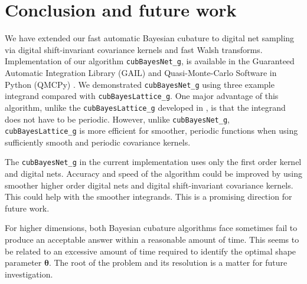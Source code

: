 \documentclass[graybox,footinfo]{svmult}
\newcommand{\FJHNote}[1]{{\textcolor{blue}{FJH: #1}}}
\begin{document}







\section{Conclusion and future work}
\label{FJ:sec:conclusion-future-work}

We have extended our fast automatic Bayesian cubature to digital net sampling via digital shift-invariant covariance kernels and fast Walsh transforms.  Implementation of our algorithm \texttt{cubBayesNet\_g}, is available in the Guaranteed Automatic Integration Library (GAIL) \cite{ChoEtal21a} and Quasi-Monte-Carlo Software in Python (QMCPy) \cite{QMCPy2020a}.  We demonstrated \texttt{cubBayesNet\_g} using three example integrand compared with \texttt{cubBayesLattice\_g}. 
One major advantage of this algorithm, unlike the \texttt{cubBayesLattice\_g} developed in \cite{RatHic19a}, is that the integrand does not have to be periodic.  However, unlike \texttt{cubBayesNet\_g}, \texttt{cubBayesLattice\_g} is more efficient for smoother, periodic functions when using sufficiently smooth and periodic covariance kernels.

The \texttt{cubBayesNet\_g} in the current implementation uses only the first order kernel and digital nets. Accuracy and speed of the algorithm could be improved by using smoother higher order digital nets and digital shift-invariant covariance kernels. This could help with the smoother integrands. This is a promising direction for future work.

For higher dimensions, both Bayesian cubature algorithms face sometimes fail to produce an acceptable answer within a reasonable amount of time.  This seems to be related to an excessive amount of time required to identify the optimal shape parameter $\boldsymbol{\theta}$.  The root of the problem and its resolution is a matter for future investigation.




% 


\end{document}
